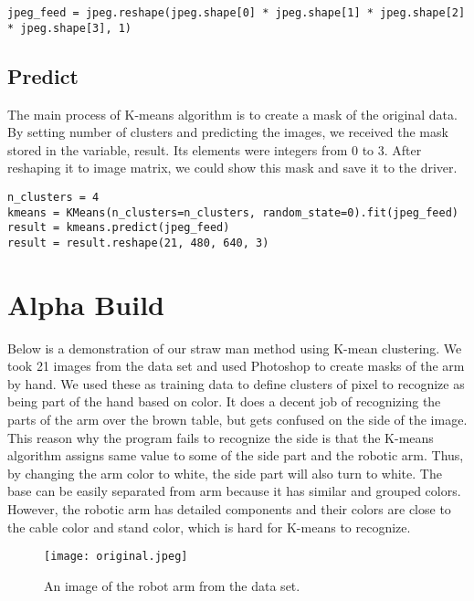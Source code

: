 \documentclass[10pt,journal,compsoc, draftclsnofoot,onecolumn]{IEEEtran}
\begin{document}
\begin{lstlisting}
jpeg_feed = jpeg.reshape(jpeg.shape[0] * jpeg.shape[1] * jpeg.shape[2] * jpeg.shape[3], 1)
\end{lstlisting}

\subsection{Predict}
The main process of K-means algorithm is to create a mask of the original data. By setting number of clusters and predicting the images, we received the mask stored in the variable, result. Its elements were integers from 0 to 3. After reshaping it to image matrix, we could show this mask and save it to the driver. 

\begin{lstlisting}
n_clusters = 4
kmeans = KMeans(n_clusters=n_clusters, random_state=0).fit(jpeg_feed)
result = kmeans.predict(jpeg_feed)
result = result.reshape(21, 480, 640, 3)
\end{lstlisting}

\section{Alpha Build}
Below is a demonstration of our straw man method using K-mean clustering. We took 21 images from the data set and used Photoshop to create masks of the arm by hand. We used these as training data to define clusters of pixel to recognize as being part of the hand based on color. It does a decent job of recognizing the parts of the arm over the brown table, but gets confused on the side of the image. \\

\noindent This reason why the program fails to recognize the side is that the K-means algorithm assigns same value to some of the side part and the robotic arm. Thus, by changing the arm color to white, the side part will also turn to white. The base can be easily separated from arm because it has similar and grouped colors. However, the robotic arm has detailed components and their colors are close to the cable color and stand color, which is hard for K-means to recognize.

\begin{figure}[H]
  \begin{center}
    \texttt{[image: original.jpeg]}
  \end{center}
  \caption{An image of the robot arm from the data set.}
\end{figure}
\end{document}

